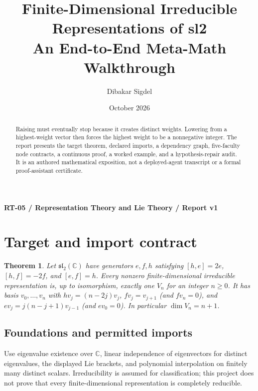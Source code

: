 \documentclass[preprint,12pt,aps,pra,showkeys,amsmath,amssymb,superscriptaddress,floatfix]{revtex4-2}
\newtheorem{theorem}{Theorem}[section]
\theoremstyle{definition}
\theoremstyle{remark}
\begin{document}
\title{Finite-Dimensional Irreducible Representations of sl2\\[4pt]\large An End-to-End Meta-Math Walkthrough}

\author{Dibakar Sigdel}


\date{October 2026}

\begin{abstract}

Raising must eventually stop because it creates distinct weights.
Lowering from a highest-weight vector then forces the highest weight to
be a nonnegative integer. The report presents the target theorem,
declared imports, a dependency graph, five-faculty node contracts, a
continuous proof, a worked example, and a hypothesis-repair audit. It is
an authored mathematical exposition, not a deployed-agent transcript or
a formal proof-assistant certificate.

\end{abstract}\maketitle\linespread{1.12}\selectfont

\noindent\textbf{RT-05 / Representation Theory and Lie Theory / Report v1}

\section{Target and import contract}

\begin{theorem}

Let \(\mathfrak{sl}_2(\mathbb C)\) have generators \(e,f,h\) satisfying
\([h,e]=2e\), \([h,f]=-2f\), and \([e,f]=h\). Every nonzero
finite-dimensional irreducible representation is, up to isomorphism,
exactly one \(V_n\) for an integer \(n\ge0\). It has basis
\(v_0,\ldots,v_n\) with \(hv_j=(n-2j)v_j\), \(fv_j=v_{j+1}\) (and
\(fv_n=0\)), and \(ev_j=j(n-j+1)v_{j-1}\) (and \(ev_0=0\)). In
particular \(\dim V_n=n+1\).

\end{theorem}

\subsection{Foundations and permitted imports}

Use eigenvalue existence over \(\mathbb C\), linear independence of
eigenvectors for distinct eigenvalues, the displayed Lie brackets, and
polynomial interpolation on finitely many distinct scalars.
Irreducibility is assumed for classification; this project does not
prove that every finite-dimensional representation is completely
reducible.
\end{document}
